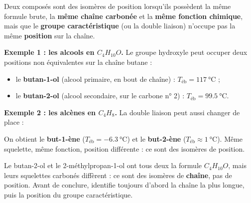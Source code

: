 \documentclass[11pt]{article}
\newcommand{\cle}[1]{{\popxbold\color{popdark}#1}}
\newcounter{popsec}
\newcounter{popsub}
\newcommand{\courssub}[1]{%
  \stepcounter{popsub}%
  \par\vspace{9pt}\noindent{\popxbold\fontsize{11.5}{13}\selectfont\color{popink}{\color{poporange}\thepopsec.\thepopsub}\hspace{6pt}#1}\par\nopagebreak\vspace{4pt}
}
\begin{document}
\courssub{Isomérie de position}

\begin{definition}
Deux composés sont des \cle{isomères de position} lorsqu'ils possèdent la même formule brute, la \textbf{même chaîne carbonée} et la \textbf{même fonction chimique}, mais que le \textbf{groupe caractéristique} (ou la double liaison) n'occupe pas la même \textbf{position} sur la chaîne.
\end{definition}

\textbf{Exemple 1 : les alcools en $C_4H_{10}O$.} Le groupe hydroxyle  peut occuper deux positions non équivalentes sur la chaîne butane :

\begin{center}
 \hspace{1.5cm} 
\end{center}

\begin{itemize}
\item le \textbf{butan-1-ol} (alcool primaire,  en bout de chaîne) : $T_{\text{éb}} = \SI{117}{\celsius}$ ;
\item le \textbf{butan-2-ol} (alcool secondaire,  sur le carbone n° 2) : $T_{\text{éb}} = \SI{99,5}{\celsius}$.
\end{itemize}

\textbf{Exemple 2 : les alcènes en $C_4H_8$.} La double liaison peut aussi changer de place :

\begin{center}
 \hspace{2cm} 
\end{center}

On obtient le \textbf{but-1-ène} ($T_{\text{éb}} = \SI{-6,3}{\celsius}$) et le \textbf{but-2-ène} ($T_{\text{éb}} \approx \SI{1}{\celsius}$). Même squelette, même fonction, position différente : ce sont des isomères de position.

\begin{attention}
Le butan-2-ol  et le 2-méthylpropan-1-ol  ont tous deux la formule $C_4H_{10}O$, mais leurs squelettes carbonés diffèrent : ce sont des isomères de \textbf{chaîne}, pas de position. Avant de conclure, identifie toujours d'abord la chaîne la plus longue, puis la position du groupe caractéristique.
\end{attention}
\end{document}
